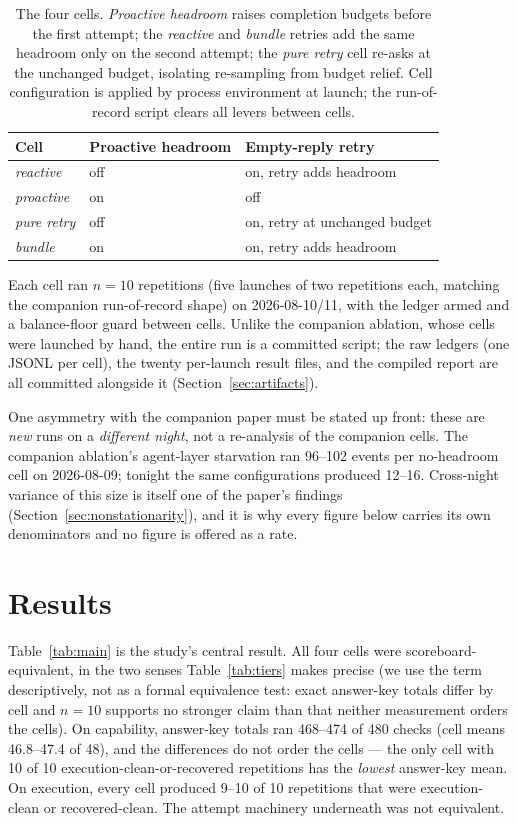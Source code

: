 \documentclass[11pt]{article}
\begin{document}
\begin{table}[!htb]
\centering\small
\begin{tabular}{lll}
\toprule
Cell & Proactive headroom & Empty-reply retry \\
\midrule
\emph{reactive} & off & on, retry adds headroom \\
\emph{proactive} & on & off \\
\emph{pure retry} & off & on, retry at unchanged budget \\
\emph{bundle} & on & on, retry adds headroom \\
\bottomrule
\end{tabular}
\caption{The four cells. \emph{Proactive headroom} raises completion
budgets before the first attempt; the \emph{reactive} and \emph{bundle}
retries add the same headroom only on the second attempt; the
\emph{pure retry} cell re-asks at the unchanged budget, isolating
re-sampling from budget relief. Cell configuration is applied by
process environment at launch; the run-of-record script clears all
levers between cells.}
\label{tab:cells}
\end{table}

Each cell ran $n{=}10$ repetitions (five launches of two repetitions
each, matching the companion run-of-record shape) on 2026-08-10/11,
with the ledger armed and a balance-floor guard between cells. Unlike
the companion ablation, whose cells were launched by hand, the entire
run is a committed script; the raw ledgers (one JSONL per cell), the
twenty per-launch result files, and the compiled report are all
committed alongside it (Section~\ref{sec:artifacts}).

One asymmetry with the companion paper must be stated up front: these
are \emph{new} runs on a \emph{different night}, not a re-analysis of
the companion cells. The companion ablation's agent-layer starvation
ran 96--102 events per no-headroom cell on 2026-08-09; tonight the same
configurations produced 12--16. Cross-night variance of this size is
itself one of the paper's findings
(Section~\ref{sec:nonstationarity}), and it is why every figure below
carries its own denominators and no figure is offered as a rate.

\section{Results}\label{sec:results}

Table~\ref{tab:main} is the study's central result. All four cells were
scoreboard-equivalent, in the two senses Table~\ref{tab:tiers} makes
precise (we use the term descriptively, not as a formal equivalence
test: exact answer-key totals differ by cell and $n{=}10$ supports no
stronger claim than that neither measurement orders the cells). On capability, answer-key totals ran 468--474 of 480 checks
(cell means 46.8--47.4 of 48), and the differences do not order the
cells --- the only cell with 10 of 10 execution-clean-or-recovered
repetitions has the \emph{lowest} answer-key mean. On execution, every
cell produced 9--10 of 10 repetitions that were execution-clean or
recovered-clean. The attempt machinery underneath was not equivalent.
\end{document}
